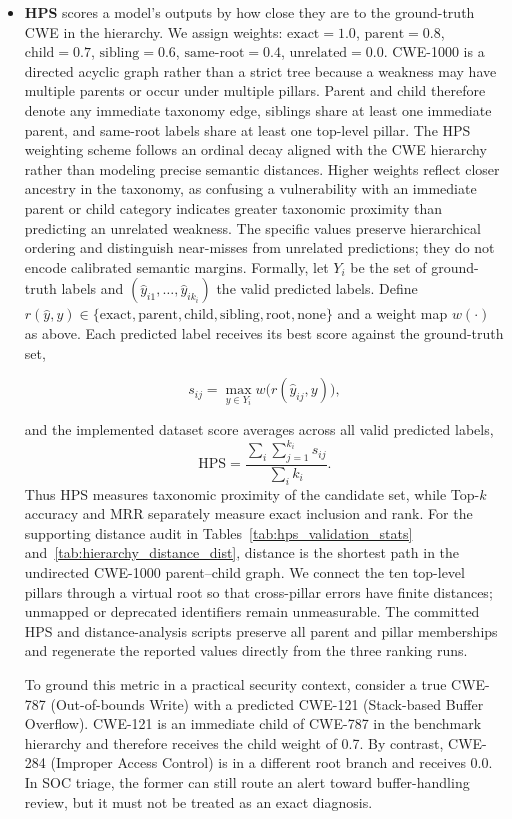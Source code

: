 \documentclass[lettersize,journal]{IEEEtran}
\begin{document}
\begin{itemize}
    \item \textbf{\gls{HPS}} scores a model's outputs by how close they are to the ground-truth \gls{CWE} in the hierarchy. We assign weights: $\text{exact}=1.0$, $\text{parent}=0.8$, $\text{child}=0.7$, $\text{sibling}=0.6$, $\text{same-root}=0.4$, $\text{unrelated}=0.0$. CWE-1000 is a directed acyclic graph rather than a strict tree because a weakness may have multiple parents or occur under multiple pillars. Parent and child therefore denote any immediate taxonomy edge, siblings share at least one immediate parent, and same-root labels share at least one top-level pillar. The HPS weighting scheme follows an ordinal decay aligned with the CWE hierarchy rather than modeling precise semantic distances. Higher weights reflect closer ancestry in the taxonomy, as confusing a vulnerability with an immediate parent or child category indicates greater taxonomic proximity than predicting an unrelated weakness. The specific values preserve hierarchical ordering and distinguish near-misses from unrelated predictions; they do not encode calibrated semantic margins. Formally, let $Y_i$ be the set of ground-truth labels and $(\hat y_{i1},\dots,\hat y_{ik_i})$ the valid predicted labels. Define $r(\hat y,y)\in\{\text{exact},\text{parent},\text{child},\text{sibling},\text{root},\text{none}\}$ and a weight map $w(\cdot)$ as above. Each predicted label receives its best score against the ground-truth set,
    
    \begin{equation}
      s_{ij}=\max_{y\in Y_i} w\big(r(\hat y_{ij},y)\big),
    \end{equation}
    
    and the implemented dataset score averages across all valid predicted labels,
    \begin{equation}
      \mathrm{HPS}=\frac{\sum_i\sum_{j=1}^{k_i}s_{ij}}{\sum_i k_i}.
    \end{equation}
    Thus HPS measures taxonomic proximity of the candidate set, while Top-$k$ accuracy and MRR separately measure exact inclusion and rank. For the supporting distance audit in Tables~\ref{tab:hps_validation_stats} and~\ref{tab:hierarchy_distance_dist}, distance is the shortest path in the undirected CWE-1000 parent--child graph. We connect the ten top-level pillars through a virtual root so that cross-pillar errors have finite distances; unmapped or deprecated identifiers remain unmeasurable. The committed HPS and distance-analysis scripts preserve all parent and pillar memberships and regenerate the reported values directly from the three ranking runs.

    To ground this metric in a practical security context, consider a true CWE-787 (Out-of-bounds Write) with a predicted CWE-121 (Stack-based Buffer Overflow). CWE-121 is an immediate child of CWE-787 in the benchmark hierarchy and therefore receives the child weight of 0.7. By contrast, CWE-284 (Improper Access Control) is in a different root branch and receives 0.0. In SOC triage, the former can still route an alert toward buffer-handling review, but it must not be treated as an exact diagnosis.
    
\end{itemize}
\end{document}

